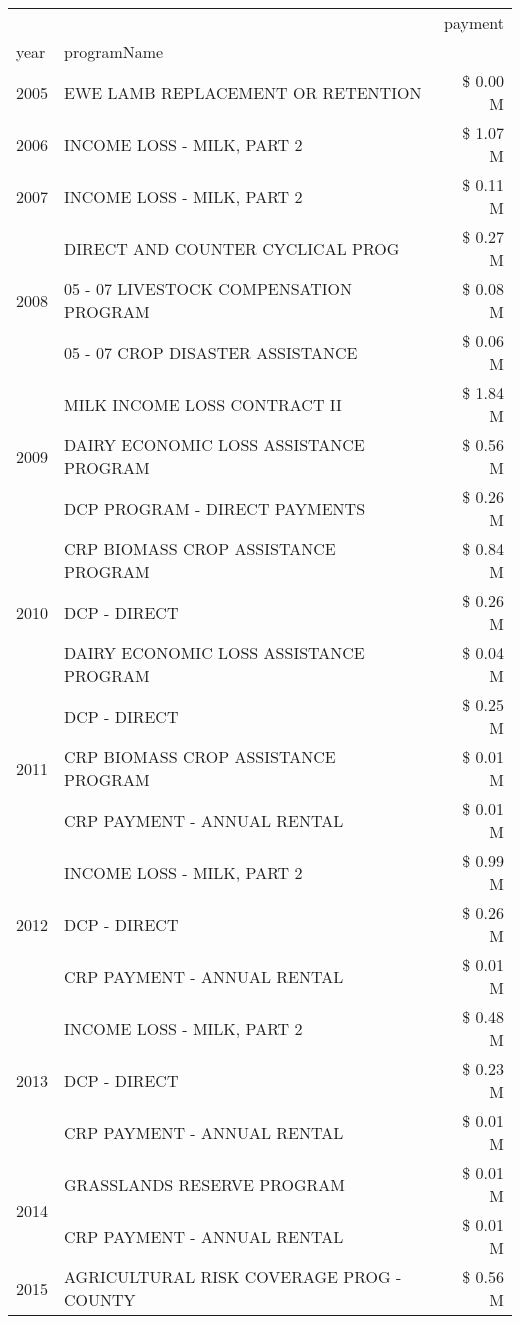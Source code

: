 \begin{tabular}{llr}
\toprule
 &  & payment \\
year & programName &  \\
\midrule
2005 & EWE LAMB REPLACEMENT OR RETENTION & \$ 0.00 M \\
\cline{1-3}
2006 & INCOME LOSS - MILK, PART 2 & \$ 1.07 M \\
\cline{1-3}
2007 & INCOME LOSS - MILK, PART 2 & \$ 0.11 M \\
\cline{1-3}
\multirow[t]{3}{*}{2008} & DIRECT AND COUNTER CYCLICAL PROG & \$ 0.27 M \\
 & 05 - 07 LIVESTOCK COMPENSATION PROGRAM & \$ 0.08 M \\
 & 05 - 07 CROP DISASTER ASSISTANCE & \$ 0.06 M \\
\cline{1-3}
\multirow[t]{3}{*}{2009} & MILK INCOME LOSS CONTRACT II & \$ 1.84 M \\
 & DAIRY ECONOMIC LOSS ASSISTANCE PROGRAM & \$ 0.56 M \\
 & DCP PROGRAM - DIRECT PAYMENTS & \$ 0.26 M \\
\cline{1-3}
\multirow[t]{3}{*}{2010} & CRP BIOMASS CROP ASSISTANCE PROGRAM & \$ 0.84 M \\
 & DCP - DIRECT & \$ 0.26 M \\
 & DAIRY ECONOMIC LOSS ASSISTANCE PROGRAM & \$ 0.04 M \\
\cline{1-3}
\multirow[t]{3}{*}{2011} & DCP - DIRECT & \$ 0.25 M \\
 & CRP BIOMASS CROP ASSISTANCE PROGRAM & \$ 0.01 M \\
 & CRP PAYMENT - ANNUAL RENTAL & \$ 0.01 M \\
\cline{1-3}
\multirow[t]{3}{*}{2012} & INCOME LOSS - MILK, PART 2 & \$ 0.99 M \\
 & DCP - DIRECT & \$ 0.26 M \\
 & CRP PAYMENT - ANNUAL RENTAL & \$ 0.01 M \\
\cline{1-3}
\multirow[t]{3}{*}{2013} & INCOME LOSS - MILK, PART 2 & \$ 0.48 M \\
 & DCP - DIRECT & \$ 0.23 M \\
 & CRP PAYMENT - ANNUAL RENTAL & \$ 0.01 M \\
\cline{1-3}
\multirow[t]{2}{*}{2014} & GRASSLANDS RESERVE PROGRAM & \$ 0.01 M \\
 & CRP PAYMENT - ANNUAL RENTAL & \$ 0.01 M \\
\cline{1-3}
\multirow[t]{3}{*}{2015} & AGRICULTURAL RISK COVERAGE PROG - COUNTY & \$ 0.56 M \\

\end{tabular}
